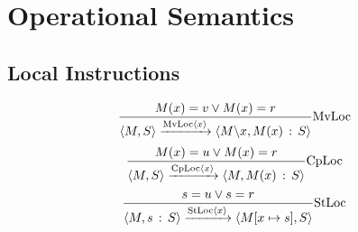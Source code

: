 \documentclass{article}
\newcommand{\colons}{\,:\,}
\newcommand{\tmop}[1]{\ensuremath{\operatorname{#1}}}
\newcommand{\tmstrong}[1]{\textbf{#1}}
\begin{document}
\section{Operational Semantics}

\subsection{Local Instructions}

\[ \frac{M (x) = v \vee M (x) = r}{\langle M, S \rangle
   \xrightarrow{\tmop{MvLoc} \langle x \rangle} \langle M\backslash x, M (x)
   \colons S \rangle}  \tmstrong{\tmop{MvLoc}} \]
\[ \frac{M (x) = u \vee M (x) = r}{\langle M, S \rangle
   \xrightarrow{\tmop{CpLoc} \langle x \rangle} \langle M, M (x) \colons S
   \rangle}  \tmstrong{\tmop{CpLoc}} \]
\[ \frac{s = u \vee s = r}{\langle M, s \colons S \rangle
   \xrightarrow{\tmop{StLoc} \langle x \rangle} \langle M [x \mapsto s], S
   \rangle}  \tmstrong{\tmop{StLoc}} \]
\end{document}
